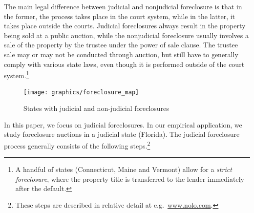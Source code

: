 \documentclass[11pt,twopage]{article}
\begin{document}
The main legal difference between judicial and nonjudicial foreclosure
is that in the former, the process takes place in the court system,
while in the latter, it takes place outside the courts. Judicial
foreclosures always result in the property being sold at a public
auction, while the nonjudicial foreclosure usually involves a sale of
the property by the trustee under the power of sale clause. The
trustee sale may or may not be conducted through auction, but still
have to generally comply with various state laws, even though it is
performed outside of the court system.\footnote{A handful of states
  (Connecticut, Maine and Vermont) allow for a \emph{strict
    foreclosure}, where the property title is transferred to the
  lender immediately after the default.}

\begin{figure}[t]
  \centering
  \texttt{[image: graphics/foreclosure\_map]}
  \caption{States with judicial and non-judicial foreclosures}
  \label{fig:judicial}
\end{figure}

In this paper, we focus on judicial foreclosures. In our empirical
application, we study foreclosure auctions in a judicial state
(Florida). The judicial foreclosure process generally consists of the
following steps.\footnote{These steps are described in relative detail
  at e.g.\ \url{www.nolo.com}.}
\end{document}
